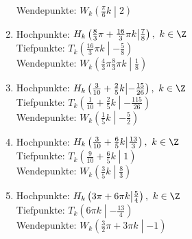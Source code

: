 \begin{Answer}[ref=sincosExtremWendeA1]
\begin{enumerate}[label=\alph*)]
		Wendepunkte: \(W_k\left(\frac{\pi}{6}k \middle\vert2 \right)\)
		\item Hochpunkte: \(H_k\left(\frac{8}{3}\pi+\frac{16}{3}\pi k \middle\vert\frac{7}{8} \right),\ k\in\Z\)\\
		Tiefpunkte: \(T_k\left(\frac{16}{3}\pi k \middle\vert-\frac{5}{8} \right)\)\\
		Wendepunkte: \(W_k\left(\frac{4}{3}\pi\frac{8}{3}\pi k \middle\vert\frac{1}{8} \right)\)
		\item Hochpunkte: \(H_k\left(\frac{3}{10}+\frac{2}{5}k \middle\vert-\frac{15}{26} \right),\ k\in\Z\)\\
		Tiefpunkte: \(T_k\left(\frac{1}{10}+\frac{2}{5}k \middle\vert-\frac{115}{26} \right)\)\\
		Wendepunkte: \(W_k\left(\frac{1}{5}k \middle\vert-\frac{5}{2} \right)\)
		\item Hochpunkte: \(H_k\left(\frac{3}{10}+\frac{6}{5}k \middle\vert\frac{13}{3} \right),\ k\in\Z\)\\
		Tiefpunkte: \(T_k\left(\frac{9}{10}+\frac{6}{5}k \middle\vert1 \right)\)\\
		Wendepunkte: \(W_k\left(\frac{3}{5}k \middle\vert\frac{8}{3} \right)\)
		\item Hochpunkte: \(H_k\left(3\pi+6\pi k \middle\vert\frac{5}{4} \right),\ k\in\Z\)\\
		Tiefpunkte: \(T_k\left(6\pi k \middle\vert-\frac{13}{4} \right)\)\\
		Wendepunkte: \(W_k\left(\frac{3}{2}\pi+3\pi k \middle\vert-1 \right)\)
	\end{enumerate}
\end{Answer}